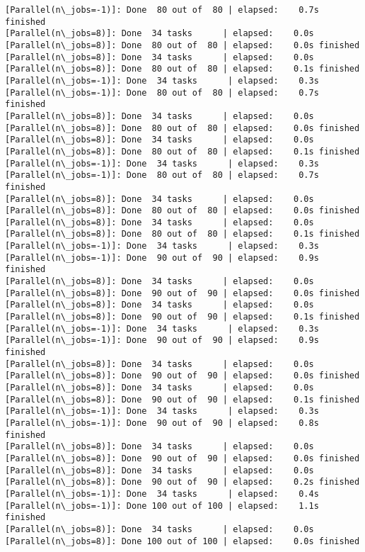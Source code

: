 \documentclass[11pt]{article}
\begin{document}
\begin{Verbatim}[commandchars=\\\{\}]
[Parallel(n\_jobs=-1)]: Done  80 out of  80 | elapsed:    0.7s finished
[Parallel(n\_jobs=8)]: Done  34 tasks      | elapsed:    0.0s
[Parallel(n\_jobs=8)]: Done  80 out of  80 | elapsed:    0.0s finished
[Parallel(n\_jobs=8)]: Done  34 tasks      | elapsed:    0.0s
[Parallel(n\_jobs=8)]: Done  80 out of  80 | elapsed:    0.1s finished
[Parallel(n\_jobs=-1)]: Done  34 tasks      | elapsed:    0.3s
[Parallel(n\_jobs=-1)]: Done  80 out of  80 | elapsed:    0.7s finished
[Parallel(n\_jobs=8)]: Done  34 tasks      | elapsed:    0.0s
[Parallel(n\_jobs=8)]: Done  80 out of  80 | elapsed:    0.0s finished
[Parallel(n\_jobs=8)]: Done  34 tasks      | elapsed:    0.0s
[Parallel(n\_jobs=8)]: Done  80 out of  80 | elapsed:    0.1s finished
[Parallel(n\_jobs=-1)]: Done  34 tasks      | elapsed:    0.3s
[Parallel(n\_jobs=-1)]: Done  80 out of  80 | elapsed:    0.7s finished
[Parallel(n\_jobs=8)]: Done  34 tasks      | elapsed:    0.0s
[Parallel(n\_jobs=8)]: Done  80 out of  80 | elapsed:    0.0s finished
[Parallel(n\_jobs=8)]: Done  34 tasks      | elapsed:    0.0s
[Parallel(n\_jobs=8)]: Done  80 out of  80 | elapsed:    0.1s finished
[Parallel(n\_jobs=-1)]: Done  34 tasks      | elapsed:    0.3s
[Parallel(n\_jobs=-1)]: Done  90 out of  90 | elapsed:    0.9s finished
[Parallel(n\_jobs=8)]: Done  34 tasks      | elapsed:    0.0s
[Parallel(n\_jobs=8)]: Done  90 out of  90 | elapsed:    0.0s finished
[Parallel(n\_jobs=8)]: Done  34 tasks      | elapsed:    0.0s
[Parallel(n\_jobs=8)]: Done  90 out of  90 | elapsed:    0.1s finished
[Parallel(n\_jobs=-1)]: Done  34 tasks      | elapsed:    0.3s
[Parallel(n\_jobs=-1)]: Done  90 out of  90 | elapsed:    0.9s finished
[Parallel(n\_jobs=8)]: Done  34 tasks      | elapsed:    0.0s
[Parallel(n\_jobs=8)]: Done  90 out of  90 | elapsed:    0.0s finished
[Parallel(n\_jobs=8)]: Done  34 tasks      | elapsed:    0.0s
[Parallel(n\_jobs=8)]: Done  90 out of  90 | elapsed:    0.1s finished
[Parallel(n\_jobs=-1)]: Done  34 tasks      | elapsed:    0.3s
[Parallel(n\_jobs=-1)]: Done  90 out of  90 | elapsed:    0.8s finished
[Parallel(n\_jobs=8)]: Done  34 tasks      | elapsed:    0.0s
[Parallel(n\_jobs=8)]: Done  90 out of  90 | elapsed:    0.0s finished
[Parallel(n\_jobs=8)]: Done  34 tasks      | elapsed:    0.0s
[Parallel(n\_jobs=8)]: Done  90 out of  90 | elapsed:    0.2s finished
[Parallel(n\_jobs=-1)]: Done  34 tasks      | elapsed:    0.4s
[Parallel(n\_jobs=-1)]: Done 100 out of 100 | elapsed:    1.1s finished
[Parallel(n\_jobs=8)]: Done  34 tasks      | elapsed:    0.0s
[Parallel(n\_jobs=8)]: Done 100 out of 100 | elapsed:    0.0s finished

\end{Verbatim}
\end{document}
